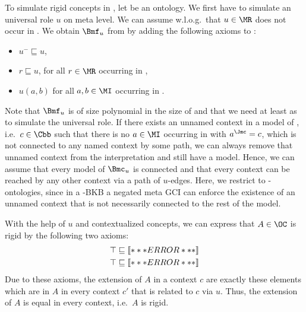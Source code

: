 \noindent
To simulate rigid concepts in \LMLOplus, let \BB be an \LMLOplus ontology. We first have to
simulate an universal role $u$ on meta level. We can assume w.l.o.g.\
that $u\in\MR$ does not occur in \Bmf. We obtain $\Bmf_{u}$ from \Bmf by adding the following axioms
to \Bmf:
\begin{itemize}
\item $u^{-} \sqsubseteq u$,
\item $r \sqsubseteq u$, for all $r\in\MR$ occurring in \Bmf,
\item $u(a,b)$ for all $a,b\in\MI$ occurring in \Bmf. 
\end{itemize}
Note that $\Bmf_{u}$ is of size polynomial in the size of \Bmf and that we need at least \ALCHI as
\LM to simulate the universal role.
%
If there exists an unnamed context in a model of \Bmf, i.e.\ $c\in\Cbb$ such that there is no
$a\in\MI$ occurring in \Bmf with $a^{\J}=c$, which is not connected to any named context by some
path, we can always remove that unnamed context from the interpretation and still have a model.
Hence, we can assume that every model of $\Bmc_{u}$ is connected and that every context can be
reached by any other context via a path of $u$-edges.
%
Here, we restrict \Bmf to \LMLOplus-ontologies, since in a \LMLOplus-BKB a negated meta GCI can
enforce the existence of an unnamed context that is not necessarily connected to the rest of the model.


With the help of $u$ and contextualized concepts, we can express that $A\in\OC$ is rigid by the
following two axioms:
\begin{align*}
  \top & \sqsubseteq \oax{A \sqsubseteq \ocont*{\top}[u]{A}} \\
  \top & \sqsubseteq \oax{\lnot A \sqsubseteq \ocont*{\top}[u]{\lnot A}}
\end{align*}
Due to these axioms, the extension of $A$ in a context $c$ are exactly these elements which are in
$A$ in every context $c'$ that is related to $c$ via $u$. Thus, the extension of $A$ is equal in
every context, i.e.\ $A$ is rigid.



